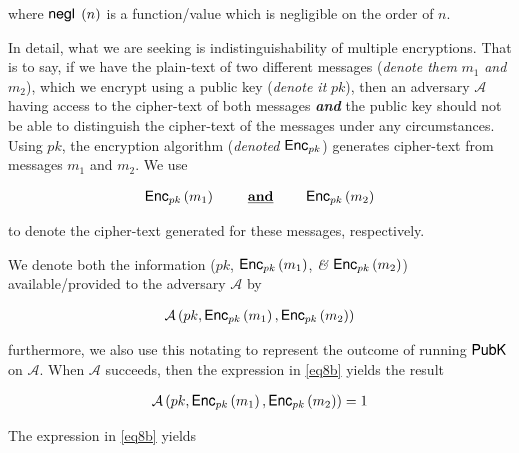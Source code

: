 \documentclass[../CryptoHW3.tex]{subfiles}
\begin{document}
\begin{flushleft}
where $\text{{\fontfamily{phv}\selectfont negl }} \left( n \right)$ is a function/value which is negligible on the order of $n$.  \newline

In detail, what we are seeking is indistinguishability of multiple encryptions.  That is to say, if we have the plain-text of two different messages (\emph{denote them} $m_1$ \emph{and} $m_2$), which we encrypt using a public key (\emph{denote it} $pk$), then an adversary $\mathcal{A}$ having access to the cipher-text of both messages \textbf{\emph{and}} the public key should not be able to distinguish the cipher-text of the messages  under any circumstances.  Using $pk$, the encryption algorithm (\emph{denoted} $\text{{\fontfamily{phv}\selectfont Enc}}_{pk}$) generates cipher-text from messages $m_1$ and $m_2$.  We use

\begin{align*}
  \text{{\fontfamily{phv}\selectfont Enc}}_{pk} \left( m_1 \right) \qquad \text{ \textbf{\underline{and}} } \qquad \text{{\fontfamily{phv}\selectfont Enc}}_{pk} \left( m_2 \right)
\end{align*}

to denote the cipher-text generated for these messages, respectively.  \newline


We denote both the information ($pk$,  $\text{{\fontfamily{phv}\selectfont Enc}}_{pk} \left( m_1 \right)$, \emph{\&} $\text{{\fontfamily{phv}\selectfont Enc}}_{pk} \left( m_2 \right)$) available/provided to the adversary $\mathcal{A}$ by

\begin{align}
  \mathcal{A} \left( pk,  \text{{\fontfamily{phv}\selectfont Enc}}_{pk} \left( m_1 \right), \text{{\fontfamily{phv}\selectfont Enc}}_{pk} \left( m_2 \right) \right) \label{eq8b}
\end{align}

furthermore, we also use this notating to represent the outcome of running $\text{{\fontfamily{phv}\selectfont PubK}}$ on $\mathcal{A}$.  When $\mathcal{A}$ succeeds, then the expression in \ref{eq8b} yields the result 

\begin{align}
  \mathcal{A} \left( pk,  \text{{\fontfamily{phv}\selectfont Enc}}_{pk} \left( m_1 \right), \text{{\fontfamily{phv}\selectfont Enc}}_{pk} \left( m_2 \right) \right) = 1 \label{eq8aaA}
\end{align}

The expression in \ref{eq8b} yields


\end{flushleft}
\end{document}
